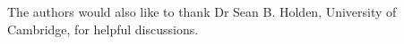 \documentclass[12pt,english]{article}\usepackage[]{graphicx}\usepackage[]{color}
\begin{document}
The authors would also like to thank Dr Sean B. Holden, University of
Cambridge, for helpful discussions.

\clearpage






\end{document}
